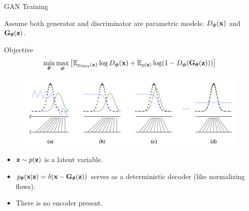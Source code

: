 \documentclass{beamer}
\begin{document}
\begin{frame}{GAN Training}

	Assume both generator and discriminator are parametric models: $D_{\boldsymbol{\phi}}(\mathbf{x})$ and $\mathbf{G}_{\boldsymbol{\theta}}(\mathbf{z})$.
	\begin{block}{Objective}
		\vspace{-0.7cm}
		\[
		\min_{\boldsymbol{\theta}} \max_{\boldsymbol{\phi}} \left[ \mathbb{E}_{p_{\text{data}}(\mathbf{x})} \log D_{\boldsymbol{\phi}}(\mathbf{x}) + \mathbb{E}_{p(\mathbf{z})} \log (1 - D_{\boldsymbol{\phi}}(\mathbf{G}_{\boldsymbol{\theta}}(\mathbf{z}))) \right]
		\]
		\vspace{-0.7cm}
	\end{block}
	\eqpause
	\begin{figure}
		\centering
		\includegraphics[width=1.0\linewidth]{figs/gan_1}
	\end{figure}
	\vspace{-0.5cm}
	\eqpause
	\begin{itemize}
		\item $\mathbf{z} \sim p(\mathbf{z})$ is a latent variable.
		\item $p_{\boldsymbol{\theta}}(\mathbf{x} | \mathbf{z}) = \delta(\mathbf{x} - \mathbf{G}_{\boldsymbol{\theta}}(\mathbf{z}))$ serves as a deterministic decoder ({\color{gray}like normalizing flows}).
		\item There is no encoder present.
	\end{itemize}
\end{frame}
\end{document}
